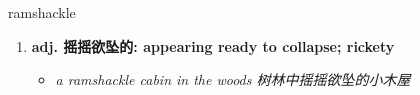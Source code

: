 
\begin{frame}
{\huge ramshackle}
\begin{center}
\begin{enumerate}\Large
  \item \textbf{adj. 摇摇欲坠的: appearing ready to collapse; rickety}
  \begin{itemize}
    \item \em{\Large{a ramshackle cabin in the woods 树林中摇摇欲坠的小木屋}}
  \end{itemize}
\end{enumerate}
\end{center}
\end{frame}
